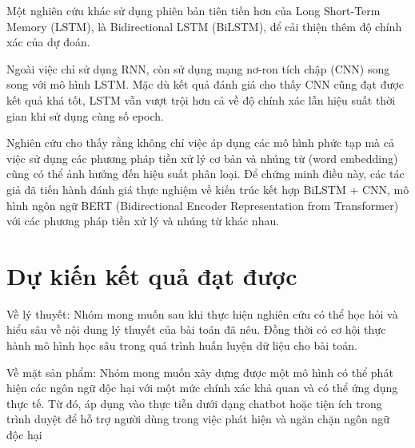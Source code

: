 Một nghiên cứu khác sử dụng phiên bản tiên tiến hơn của Long Short-Term Memory (LSTM), là Bidirectional LSTM (BiLSTM), để cải thiện thêm độ chính xác của dự đoán\cite{webpage25}. 

Ngoài việc chỉ sử dụng RNN, \cite{Sharma_Patel_2018} còn sử dụng mạng nơ-ron tích chập (CNN) song song với mô hình LSTM. Mặc dù kết quả đánh giá cho thấy CNN cũng đạt được kết quả khá tốt, LSTM vẫn vượt trội hơn cả về độ chính xác lẫn hiệu suất thời gian khi sử dụng cùng số epoch. 

Nghiên cứu \cite{Kresnakova} cho thấy rằng không chỉ việc áp dụng các mô hình phức tạp mà cả việc sử dụng các phương pháp tiền xử lý cơ bản và nhúng từ (word embedding) cũng có thể ảnh hưởng đến hiệu suất phân loại. Để chứng minh điều này, các tác giả đã tiến hành đánh giá thực nghiệm về kiến trúc kết hợp BiLSTM + CNN, mô hình ngôn ngữ BERT (Bidirectional Encoder Representation from Transformer) với các phương pháp tiền xử lý và nhúng từ khác nhau.

\section{Dự kiến kết quả đạt được}
Về lý thuyết: Nhóm mong muốn sau khi thực hiện nghiên cứu có thể học hỏi và hiểu sâu về nội dung lý thuyết của bài toán đã nêu. Đồng thời có cơ hội thực hành mô hình học sâu trong quá trình huấn luyện dữ liệu cho bài toán.

Về mặt sản phẩm: Nhóm mong muốn xây dựng được một mô hình có thể phát hiện các ngôn ngữ độc hại với một mức chính xác khả quan và có thể ứng dụng thực tế. Từ đó, áp dụng vào thực tiễn dưới dạng chatbot hoặc tiện ích trong trình duyệt để hỗ trợ người dùng trong việc phát hiện và ngăn chặn ngôn ngữ độc hại

